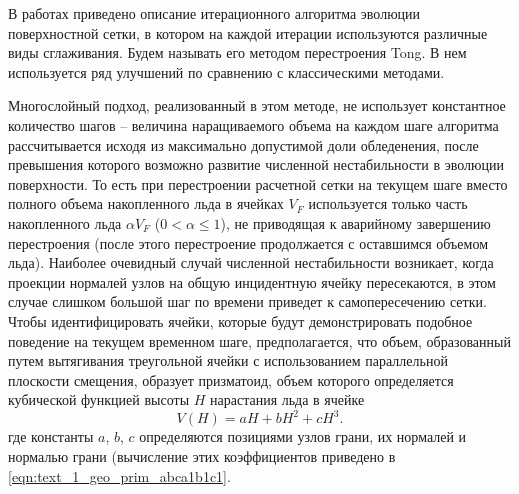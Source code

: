 В работах \cite{Thompson2013Remesh,Tong2017Remesh} приведено описание итерационного алгоритма эволюции поверхностной сетки, в котором на каждой итерации используются различные виды сглаживания.
Будем называть его методом перестроения Tong.
В нем используется ряд улучшений по сравнению с классическими методами.

Многослойный подход, реализованный в этом методе, не использует константное количество шагов -- величина наращиваемого объема на каждом шаге алгоритма рассчитывается исходя из максимально допустимой доли обледенения, после превышения которого возможно развитие численной нестабильности в эволюции поверхности.
То есть при перестроении расчетной сетки на текущем шаге вместо полного объема накопленного льда в ячейках $V_F$ используется только часть накопленного льда $\alpha V_F$ ($0 < \alpha \le 1$), не приводящая к аварийному завершению перестроения (после этого перестроение продолжается с оставшимся объемом льда).
Наиболее очевидный случай численной нестабильности возникает, когда проекции нормалей узлов на общую инцидентную ячейку пересекаются, в этом случае слишком большой шаг по времени приведет к самопересечению сетки.
Чтобы идентифицировать ячейки, которые будут демонстрировать подобное поведение на текущем временном шаге, предполагается, что объем, образованный путем вытягивания треугольной ячейки с использованием параллельной плоскости смещения, образует призматоид, объем которого определяется кубической функцией высоты $H$ нарастания льда в ячейке
\begin{equation}\label{text_1_remesh_3d_tong1}
	V(H)=aH+bH^2+cH^3.
\end{equation}
где константы $a$, $b$, $c$ определяются позициями узлов грани, их нормалей и нормалью грани (вычисление этих коэффициентов приведено в \eqref{eqn:text_1_geo_prim_abca1b1c1}.

